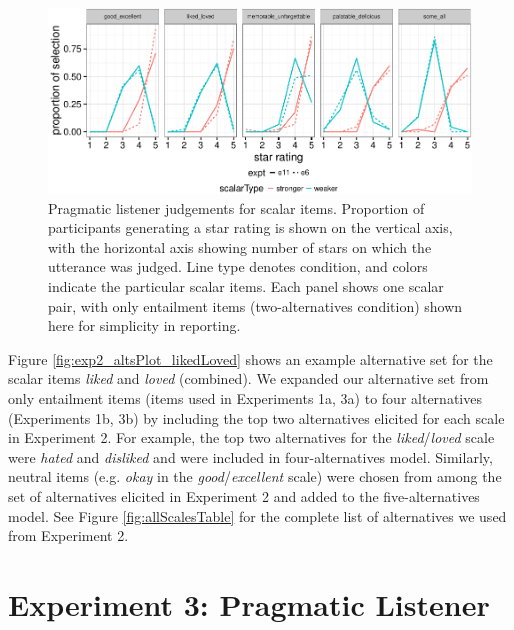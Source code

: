 \documentclass[10pt, letterpaper]{article}
\newenvironment{CodeChunk}{}{}
\begin{document}
\begin{CodeChunk}
\begin{figure}[t]

{\centering \includegraphics{figs/exp2Plots-1} 

}

\caption[Pragmatic listener judgements for scalar items]{Pragmatic listener judgements for scalar items. Proportion of participants generating a star rating is shown on the vertical axis, with the horizontal axis showing number of stars on which the utterance was judged. Line type denotes condition, and colors indicate the particular scalar items. Each panel shows one scalar pair, with only entailment items (two-alternatives condition) shown here for simplicity in reporting.}\label{fig:exp2Plots}
\end{figure}
\end{CodeChunk}

Figure \ref{fig:exp2_altsPlot_likedLoved} shows an example alternative
set for the scalar items \emph{liked} and \emph{loved} (combined). We
expanded our alternative set from only entailment items (items used in
Experiments 1a, 3a) to four alternatives (Experiments 1b, 3b) by
including the top two alternatives elicited for each scale in Experiment
2. For example, the top two alternatives for the
\emph{liked}/\emph{loved} scale were \emph{hated} and \emph{disliked}
and were included in four-alternatives model. Similarly, neutral items
(e.g. \emph{okay} in the \emph{good}/\emph{excellent} scale) were chosen
from among the set of alternatives elicited in Experiment 2 and added to
the five-alternatives model. See Figure \ref{fig:allScalesTable} for the
complete list of alternatives we used from Experiment 2.

\section{Experiment 3: Pragmatic
Listener}\label{experiment-3-pragmatic-listener}
\end{document}
